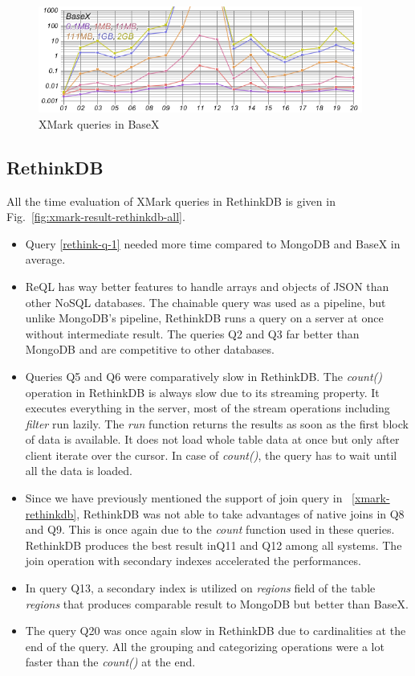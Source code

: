 \begin{figure}[hbt]
	\centering
	\includegraphics[width=0.95\textwidth]{img/result/basex/basex-all}
	\caption{XMark queries in BaseX}
	\label{fig:xmark-result-basex-all}
\end{figure}

\subsection{RethinkDB}
All the time evaluation of XMark queries in RethinkDB is given in Fig.~\ref{fig:xmark-result-rethinkdb-all}. 
\begin{itemize}
\item Query \ref{rethink-q-1} needed more time compared to MongoDB and BaseX in average. 
 \item  
  ReQL has way better features  to handle arrays and objects of JSON than other NoSQL databases. The chainable query was used as a pipeline, but unlike MongoDB's pipeline, RethinkDB runs a query on a server at once without intermediate result. The queries Q2 and Q3 far better than MongoDB and are competitive to other databases. 
 \item
 Queries Q5 and Q6 were comparatively slow in  RethinkDB. The \textit{count()} operation in RethinkDB is always slow due to its streaming property. It executes everything in the server, most of the stream operations including \textit{filter} run lazily. The \textit{run} function returns the results as soon as the first block of data is available. It does not load whole table data  at once but only after client iterate over the cursor. In case of \textit{count()}, the query has to wait until all the data is loaded.
 
 
 \item Since we have previously mentioned the support of join query in ~\ref{xmark-rethinkdb}, RethinkDB was not able to take advantages of native joins in Q8 and Q9. This is once again due to the \textit{count} function used in these queries. RethinkDB produces the best result inQ11 and Q12  among all systems. The join operation with secondary indexes accelerated the performances.
 
\item In query Q13,  a secondary index is utilized on \textit{regions} field of the table \textit{regions} that produces comparable result to MongoDB but better than BaseX.  

\item The query Q20 was once again slow in RethinkDB due to cardinalities at the end of the query. All the grouping and categorizing operations were a lot faster than the \textit{count()} at the end. 
\end{itemize}

